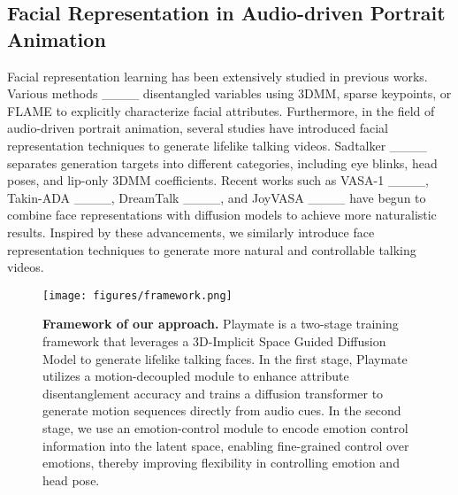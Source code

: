 \subsection{Facial Representation in Audio-driven Portrait Animation}
Facial representation learning has been extensively studied in previous works. Various methods ____ disentangled variables using 3DMM, sparse keypoints, or FLAME to explicitly characterize facial attributes. Furthermore, in the field of audio-driven portrait animation, several studies have introduced facial representation techniques to generate lifelike talking videos. Sadtalker ____ separates generation targets into different categories, including eye blinks, head poses, and lip-only 3DMM coefficients. Recent works such as VASA-1 ____, Takin-ADA ____, DreamTalk ____, and JoyVASA ____ have begun to combine face representations with diffusion models to achieve more naturalistic results. Inspired by these advancements, we similarly introduce face representation techniques to generate more natural and controllable talking videos. 
\setcounter{figure}{1}
\begin{figure*}[!t]
    \centering
    \texttt{[image: figures/framework.png]}
    \caption{\textbf{Framework of our approach.} Playmate is a two-stage training framework that leverages a 3D-Implicit Space Guided Diffusion Model to generate lifelike talking faces. In the first stage, Playmate utilizes a motion-decoupled module to enhance attribute disentanglement accuracy and trains a diffusion transformer to generate motion sequences directly from audio cues. In the second stage, we use an emotion-control module to encode emotion control information into the latent space, enabling fine-grained control over emotions, thereby improving flexibility in controlling emotion and head pose.}
    \label{fig:framework}
    \vskip -0.1in
\end{figure*}